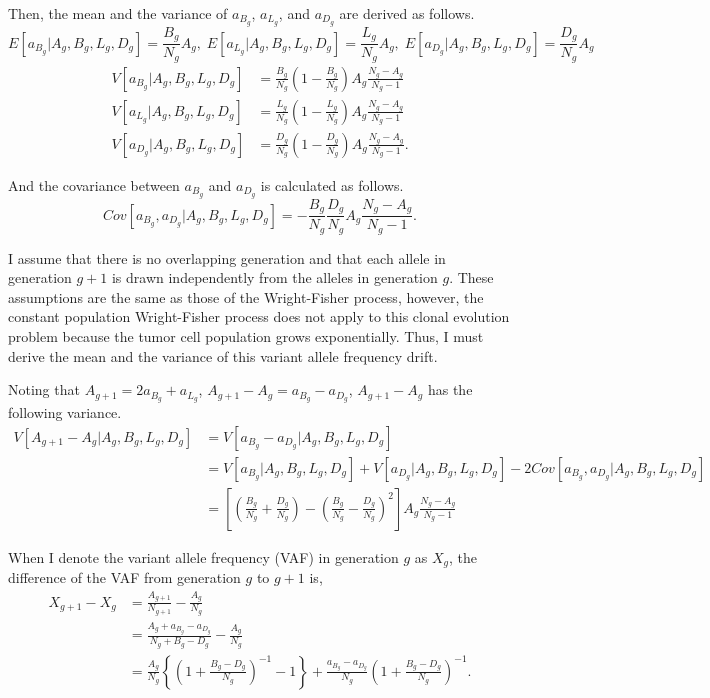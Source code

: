 \documentclass{article}
\begin{document}
Then, the mean and the variance of $a_{B_g}$, $a_{L_g}$, and $a_{D_g}$ are derived as follows.
\begin{equation}
 E[a_{B_g} | A_g, B_g, L_g, D_g] = \frac{B_g}{N_g} A_g,\; E[a_{L_g} | A_g, B_g, L_g, D_g] = \frac{L_g}{N_g} A_g,\; E[a_{D_g} | A_g, B_g, L_g, D_g] = \frac{D_g}{N_g} A_g
\end{equation}
\begin{align*}
 V[a_{B_g} | A_g, B_g, L_g, D_g] &= \frac{B_g}{N_g} \left(1 - \frac{B_g}{N_g}\right) A_g \frac{N_g - A_g}{N_g - 1}\\
 V[a_{L_g} | A_g, B_g, L_g, D_g] &= \frac{L_g}{N_g} \left(1 - \frac{L_g}{N_g}\right) A_g \frac{N_g - A_g}{N_g - 1}\\
 V[a_{D_g} | A_g, B_g, L_g, D_g] &= \frac{D_g}{N_g} \left(1 - \frac{D_g}{N_g}\right) A_g \frac{N_g - A_g}{N_g - 1}.
\end{align*}

And the covariance between $a_{B_g}$ and $a_{D_g}$ is calculated as follows.
\begin{equation}
 Cov[a_{B_g}, a_{D_g} | A_g, B_g, L_g, D_g] = - \frac{B_g}{N_g} \frac{D_g}{N_g} A_g \frac{N_g - A_g}{N_g - 1}.
\end{equation}

I assume that there is no overlapping generation and that each allele in generation $g+1$ is drawn independently from the alleles in generation $g$. These assumptions are the same as those of the Wright-Fisher process, however, the constant population Wright-Fisher process does not apply to this clonal evolution problem because the tumor cell population grows exponentially. Thus, I must derive the mean and the variance of this variant allele frequency drift.

Noting that $A_{g+1} = 2a_{B_g} + a_{L_g}$, $A_{g+1} - A_g = a_{B_g} - a_{D_g}$, $A_{g+1} - A_g$ has the following variance.
\begin{align}
 V[A_{g+1} - A_g | A_g, B_g, L_g, D_g] &= V[a_{B_g} - a_{D_g} | A_g, B_g, L_g, D_g]\nonumber\\
 &= V[a_{B_g} | A_g, B_g, L_g, D_g] + V[a_{D_g} | A_g, B_g, L_g, D_g] - 2Cov[a_{B_g}, a_{D_g} | A_g, B_g, L_g, D_g]\nonumber\\
 &= \left[ \left( \frac{B_g}{N_g} + \frac{D_g}{N_g} \right) - \left( \frac{B_g}{N_g} - \frac{D_g}{N_g} \right)^2 \right] A_g \frac{N_g - A_g}{N_g - 1}
\end{align}

When I denote the variant allele frequency (VAF) in generation $g$ as $X_g$, the difference of the VAF from generation $g$ to $g+1$ is,
\begin{align}
 X_{g+1} - X_g &= \frac{A_{g+1}}{N_{g+1}} - \frac{A_g}{N_g} \nonumber\\
 & = \frac{A_g + a_{B_g} - a_{D_g}}{N_g + B_g - D_g} - \frac{A_g}{N_g} \nonumber \\
 & = \frac{A_g}{N_g} \left\{ \left(1 + \frac{B_g - D_g}{N_g}\right)^{-1} - 1 \right\} + \frac{a_{B_g} - a_{D_g}}{N_g} \left( 1 + \frac{B_g - D_g}{N_g} \right)^{-1}.
\end{align}
\end{document}
